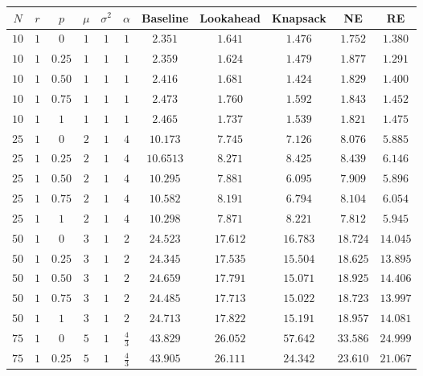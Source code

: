 \documentclass[12pt]{scrartcl}
\begin{document}
\begin{figure}[h]
\centering
 \begin{longtable}{|c|c|c|c|c|c|c|c|c|c|c|} 
 \hline
 $N$ & $r$ & $p$ & $\mu$ & $\sigma^2$ & $\alpha$ & Baseline & Lookahead & Knapsack & NE & RE \\
 \hline 
  $10$ & $1$ & $0$ & $1$ & $1$ & $1$ & $2.351$ & $1.641$ & $1.476$ & $1.752$ & $1.380$\\ 
 \hline
 $10$ & $1$ & $0.25$ & $1$ & $1$ & $1$ & $2.359$ & $1.624$ & $1.479$ & $1.877$ & $1.291$ \\
 \hline
 $10$ & $1$ & $0.50$ & $1$ & $1$ & $1$ & $2.416$ & $1.681$ & $1.424$ & $1.829$ & $1.400$ \\
 \hline
 $10$ & $1$ & $0.75$ & $1$ & $1$ & $1$ & $2.473$ & $1.760$ & $1.592$ & $1.843$ & $1.452$ \\
 \hline
 $10$ & $1$ & $1$ & $1$ & $1$ & $1$ & $2.465$ & $1.737$ & $1.539$ & $1.821$ & $1.475$ \\ 
 \hline
 $25$ & $1$ & $0$ & $2$ & $1$ & $4$ & $10.173$ & $7.745$ & $7.126$ & $8.076$ & $5.885$ \\
 \hline
 $25$ & $1$ & $0.25$ & $2$ & $1$ & $4$ & $10.6513$ & $8.271$ & $8.425$ & $8.439$ & $6.146$ \\
 \hline
 $25$ & $1$ & $0.50$ & $2$ & $1$ & $4$ & $10.295$ & $7.881$ & $6.095$ & $7.909$ & $5.896$ \\
 \hline
 $25$ & $1$ & $0.75$ & $2$ & $1$ & $4$ & $10.582$ & $8.191$ & $6.794$ & $8.104$ & $6.054$ \\
 \hline
 $25$ & $1$ & $1$ & $2$  & $1$ & $4$ & $10.298$ & $7.871$ & $8.221$ & $7.812$ & $5.945$ \\
 \hline
 $50$ & $1$ & $0$ & $3$ & $1$ & $2$ & $24.523$ & $17.612$ & $16.783$ & $18.724$ & $14.045$ \\
 \hline
 $50$ & $1$ & $0.25$ & $3$ & $1$ & $2$ & $24.345$ & $17.535$ & $15.504$ & $18.625$ & $13.895$ \\
 \hline
 $50$ & $1$ & $0.50$ & $3$ & $1$ & $2$ & $24.659$ & $17.791$ & $15.071$ & $18.925$ & $14.406$ \\
 \hline
 $50$ & $1$ & $0.75$ & $3$ & $1$ & $2$ & $24.485$ & $17.713$ & $15.022$ & $18.723$ & $13.997$ \\
 \hline
 $50$ & $1$ & $1$ & $3$ & $1$ & $2$ & $24.713$ & $17.822$ & $15.191$ & $18.957$ & $14.081$ \\
 \hline
 $75$ & $1$ & $0$ & $5$ & $1$ & $\frac{4}{3}$ & $43.829$ & $26.052$ & $57.642$ & $33.586$ & $24.999$ \\
 \hline
 $75$ & $1$ & $0.25$ & $5$ & $1$ & $\frac{4}{3}$ & $43.905$ & $26.111$ & $24.342$ & $23.610$ & $21.067$ \\

\end{longtable}
\end{figure}
\end{document}
